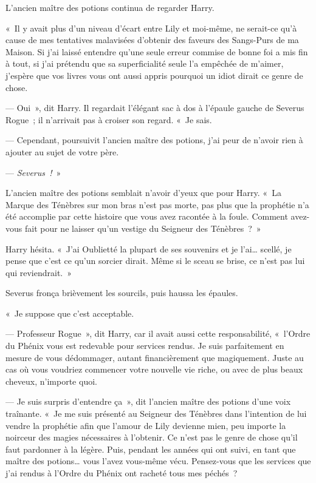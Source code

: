 L'ancien maître des potions continua de regarder Harry.

«~Il y avait plus d'un niveau d'écart entre Lily et moi-même, ne serait-ce qu'à cause de mes tentatives malavisées d'obtenir des faveurs des Sangs-Purs de ma Maison. Si j'ai laissé entendre qu'une seule erreur commise de bonne foi a mis fin à tout, si j'ai prétendu que sa superficialité seule l'a empêchée de m'aimer, j'espère que vos livres vous ont aussi appris pourquoi un idiot dirait ce genre de chose.

--- Oui~», dit Harry. Il regardait l'élégant sac à dos à l'épaule gauche de Severus Rogue~; il n'arrivait pas à croiser son regard. «~Je sais.

--- Cependant, poursuivit l'ancien maître des potions, j'ai peur de n'avoir rien à ajouter au sujet de votre père.

--- \emph{Severus~!}~»

L'ancien maître des potions semblait n'avoir d'yeux que pour Harry. «~La Marque des Ténèbres sur mon bras n'est pas morte, pas plus que la prophétie n'a été accomplie par cette histoire que vous avez racontée à la foule. Comment avez-vous fait pour ne laisser qu'un vestige du Seigneur des Ténèbres~?~»

Harry hésita. «~J'ai Oublietté la plupart de ses souvenirs et je l'ai… scellé, je pense que c'est ce qu'un sorcier dirait. Même si le sceau se brise, ce n'est pas lui qui reviendrait.~»

Severus fronça brièvement les sourcils, puis haussa les épaules.

«~Je suppose que c'est acceptable.

--- Professeur Rogue~», dit Harry, car il avait aussi cette responsabilité, «~l'Ordre du Phénix vous est redevable pour services rendus. Je suis parfaitement en mesure de vous dédommager, autant financièrement que magiquement. Juste au cas où vous voudriez commencer votre nouvelle vie riche, ou avec de plus beaux cheveux, n'importe quoi.

--- Je suis surpris d'entendre ça~», dit l'ancien maître des potions d'une voix traînante. «~Je me suis présenté au Seigneur des Ténèbres dans l'intention de lui vendre la prophétie afin que l'amour de Lily devienne mien, peu importe la noirceur des magies nécessaires à l'obtenir. Ce n'est pas le genre de chose qu'il faut pardonner à la légère. Puis, pendant les années qui ont suivi, en tant que maître des potions… vous l'avez vous-même vécu. Pensez-vous que les services que j'ai rendus à l'Ordre du Phénix ont racheté tous mes péchés~?

